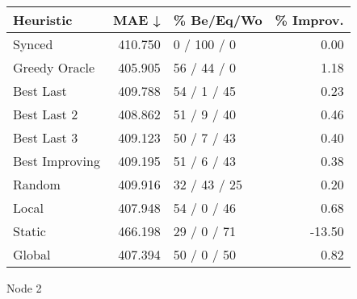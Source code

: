 \begin{tabular}{lrlr}
\toprule
\textbf{Heuristic} & \textbf{MAE ↓} & \textbf{\% Be/Eq/Wo} & \textbf{\% Improv.} \\
\midrule
            Synced &        410.750 &          0 / 100 / 0 &                0.00 \\
     Greedy Oracle &        405.905 &          56 / 44 / 0 &                1.18 \\
         Best Last &        409.788 &          54 / 1 / 45 &                0.23 \\
       Best Last 2 &        408.862 &          51 / 9 / 40 &                0.46 \\
       Best Last 3 &        409.123 &          50 / 7 / 43 &                0.40 \\
    Best Improving &        409.195 &          51 / 6 / 43 &                0.38 \\
            Random &        409.916 &         32 / 43 / 25 &                0.20 \\
             Local &        407.948 &          54 / 0 / 46 &                0.68 \\
            Static &        466.198 &          29 / 0 / 71 &              -13.50 \\
            Global &        407.394 &          50 / 0 / 50 &                0.82 \\
\bottomrule
\end{tabular}
\caption{Node 2}
\label{tab:iid_lr05_le1_bs4_2}
